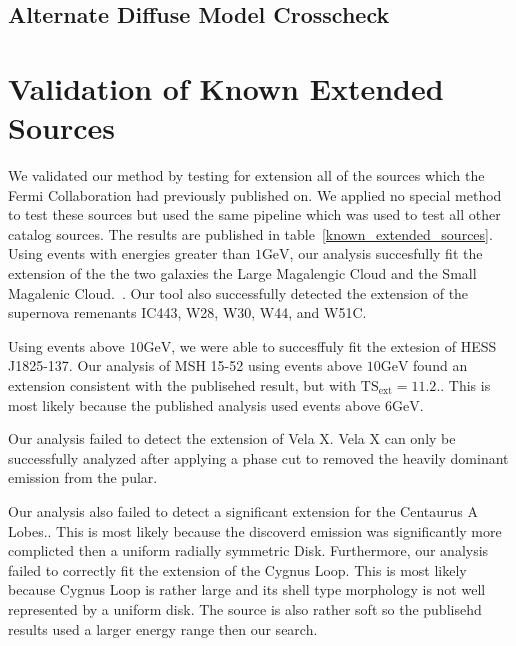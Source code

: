 \documentclass[preprint]{aastex}
\newcommand{\gev}{\text{GeV}\xspace}
\newcommand{\tsext}{{\ensuremath{\text{TS}_\text{ext}}}\xspace}
\begin{document}




\subsection{Alternate Diffuse Model Crosscheck}
\label{alt_diff_model_description}


\section{Validation of Known Extended Sources}
\label{validate_known}

We validated our method by testing for extension all of the sources
which the Fermi Collaboration had previously published on.  We applied
no special method to test these sources but used the same pipeline which
was used to test all other catalog sources.  The results are published
in table~\ref{known_extended_sources}.  Using events with energies
greater than $1\gev$, our analysis succesfully fit the extension of the
the two galaxies the Large Magalengic Cloud and the Small Magalenic
Cloud.~\cite{SMC & LMC Paper}.  Our tool also successfully detected the
extension of the supernova remenants IC443, W28, W30, W44, and W51C.

Using events above $10\gev$, we were able to succesffuly fit the extesion
of HESS J1825-137\cite{HESS 1825 paper}. Our analysis of MSH 15-52 using
events above $10\gev$ found an extension consistent with the publisehed
result, but with $\tsext=11.2$.\cite{MSH 15-52 Paper}. This
is most likely because the published analysis used events above $6\gev$.

Our analysis failed to detect the extension of Vela X. Vela X can only be
successfully analyzed after applying a phase cut to removed the heavily
dominant emission from the pular.

Our analysis also failed to detect a significant extension for the
Centaurus A Lobes.\cite{CenA paper}. This is most likely because the
discoverd emission was significantly more complicted then a uniform
radially symmetric Disk.  Furthermore, our analysis failed to correctly
fit the extension of the Cygnus Loop\cite{Cygnus Loop Paper}.  This is
most likely because Cygnus Loop is rather large and its shell type
morphology is not well represented by a uniform disk. The source is
also rather soft so the publisehd results used a larger energy range
then our search.
\end{document}
